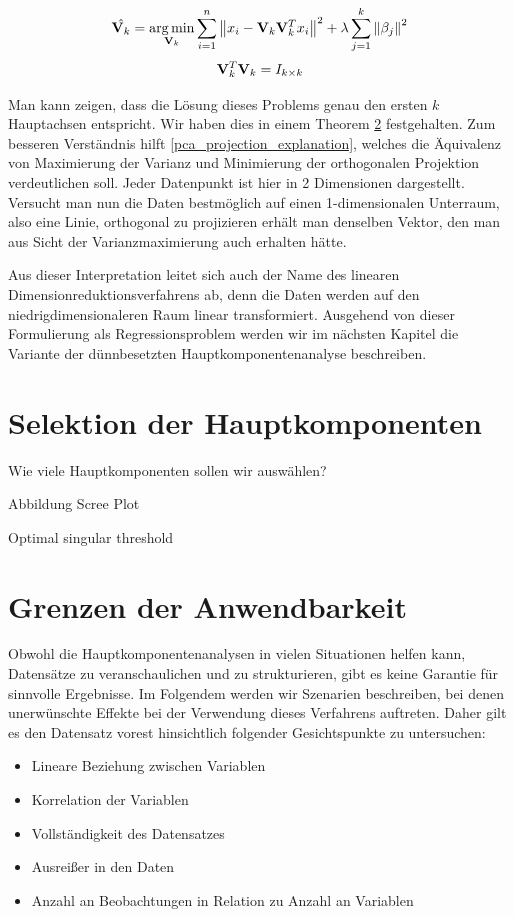 $$\hat{\mathbf{V}_k} = \operatorname*{arg\,min}_{\mathbf{V}_k} \sum_{i=1}^{n} \left\lVert x_i - \mathbf{V}_k \mathbf{V}_k^Tx_i \right\rVert^2 + \lambda \sum_{j=1}^{k}\left\lVert \beta_j \right\rVert^2$$
$$\mathbf{V}_k^T\mathbf{V}_k = I_{k \times k}$$

Man kann zeigen, dass die Lösung dieses Problems genau den ersten $k$ Hauptachsen entspricht. Wir haben dies in einem Theorem \ref{theo_results} festgehalten.  \cite{vidal} Zum besseren Verständnis hilft \ref{pca_projection_explanation}, welches die Äquivalenz von Maximierung der Varianz und Minimierung der orthogonalen Projektion verdeutlichen soll. Jeder Datenpunkt ist hier in 2 Dimensionen dargestellt. Versucht man nun die Daten bestmöglich auf einen 1-dimensionalen Unterraum, also eine Linie, orthogonal zu projizieren erhält man denselben Vektor, den man aus Sicht der Varianzmaximierung auch erhalten hätte. 

Aus dieser Interpretation leitet sich auch der Name des linearen Dimensionreduktionsverfahrens ab, denn die Daten werden auf den niedrigdimensionaleren Raum linear transformiert. Ausgehend von dieser Formulierung als Regressionsproblem werden wir im nächsten Kapitel die Variante der dünnbesetzten Hauptkomponentenanalyse beschreiben.


\section{Selektion der Hauptkomponenten}
\label{selection_principal_components}
Wie viele Hauptkomponenten sollen wir auswählen?

Abbildung Scree Plot

Optimal singular threshold \cite{gavish}

\section{Grenzen der Anwendbarkeit} \label{theo_results}

Obwohl die Hauptkomponentenanalysen in vielen Situationen helfen kann, Datensätze zu veranschaulichen und zu strukturieren, gibt es keine Garantie für sinnvolle Ergebnisse. Im Folgendem werden wir Szenarien beschreiben, bei denen unerwünschte Effekte bei der Verwendung dieses Verfahrens auftreten. Daher gilt es den Datensatz vorest hinsichtlich folgender Gesichtspunkte zu untersuchen: 

\begin{itemize}
\item Lineare Beziehung zwischen Variablen
\item Korrelation der Variablen
\item Vollständigkeit des Datensatzes
\item Ausreißer in den Daten
\item Anzahl an Beobachtungen in Relation zu Anzahl an Variablen
\end{itemize}

